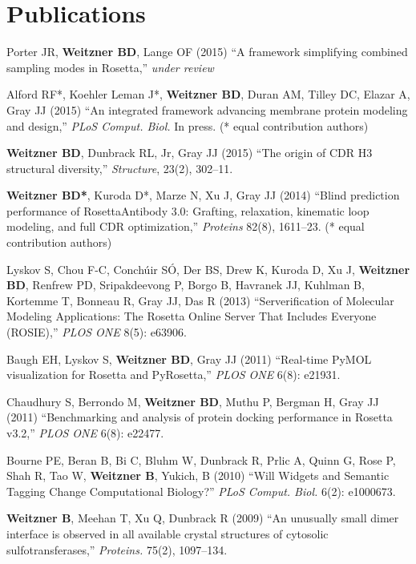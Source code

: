 \documentclass[12pt]{article}
\newcommand{\allcapsspacing}[1]{{\addfontfeature{LetterSpace=7.5}#1}}
\begin{document}
\section*{\allcapsspacing{Publications}}
\begin{etaremune}
\item Porter JR, \textbf{Weitzner BD}, Lange OF (2015) ``A framework simplifying combined sampling modes in Rosetta,'' \textit{under review}
\item Alford RF*, Koehler Leman J*, \textbf{Weitzner BD}, Duran AM, Tilley DC, Elazar A, Gray JJ (2015) ``An integrated framework advancing membrane protein modeling and design,'' \textit{PLoS Comput. Biol.} In press. (* equal contribution authors)
\item \textbf{Weitzner BD}, Dunbrack RL, Jr, Gray JJ (2015) ``The origin of CDR H3 structural diversity,'' \textit{Structure}, 23(2), 302--11.
\item \textbf{Weitzner BD*}, Kuroda D*, Marze N, Xu J, Gray JJ (2014) ``Blind prediction performance of RosettaAntibody 3.0: Grafting, relaxation, kinematic loop modeling, and full CDR optimization,'' \textit{Proteins} 82(8), 1611--23. (* equal contribution authors)
\item Lyskov S, Chou F-C, Conch{\'u}ir S{\'O}, Der BS, Drew K, Kuroda D, Xu J, \textbf{Weitzner BD}, Renfrew PD, Sripakdeevong P, Borgo B, Havranek JJ, Kuhlman B, Kortemme T, Bonneau R, Gray JJ, Das R (2013) ``Serverification of Molecular Modeling Applications: The Rosetta Online Server That Includes Everyone (ROSIE),'' \textit{PLOS ONE} 8(5): e63906.
\item Baugh EH, Lyskov S, \textbf{Weitzner BD}, Gray JJ (2011) ``Real-time PyMOL visualization for Rosetta and PyRosetta,'' \textit{PLOS ONE} 6(8): e21931.
\item Chaudhury S, Berrondo M, \textbf{Weitzner BD}, Muthu P, Bergman H, Gray JJ (2011) ``Benchmarking and analysis of protein docking performance in Rosetta v3.2,'' \textit{PLOS ONE} 6(8): e22477.
\item Bourne PE, Beran B, Bi C, Bluhm W, Dunbrack R, Prlic A, Quinn G, Rose P, Shah R, Tao W, \textbf{Weitzner B}, Yukich, B (2010) ``Will Widgets and Semantic Tagging Change Computational Biology?'' \textit{PLoS Comput. Biol.} 6(2): e1000673.
\item \textbf{Weitzner B}, Meehan T, Xu Q, Dunbrack R (2009) ``An unusually small dimer interface is observed in all available crystal structures of cytosolic sulfotransferases,'' \textit{Proteins.} 75(2), 1097--134.
\end{etaremune}
\end{document}
